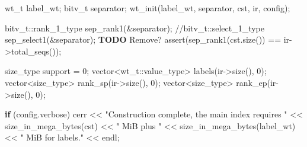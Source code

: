 \documentclass[
]{article}
\newenvironment{Shaded}{\begin{snugshade}}{\end{snugshade}}
\newcommand{\AlertTok}[1]{\textcolor[rgb]{0.58,0.85,0.30}{\textbf{\colorbox[rgb]{0.30,0.12,0.14}{#1}}}}
\newcommand{\CommentTok}[1]{\textcolor[rgb]{0.48,0.49,0.49}{#1}}
\newcommand{\ControlFlowTok}[1]{\textcolor[rgb]{0.99,0.74,0.29}{\textbf{#1}}}
\newcommand{\DecValTok}[1]{\textcolor[rgb]{0.96,0.45,0.00}{#1}}
\newcommand{\NormalTok}[1]{\textcolor[rgb]{0.81,0.81,0.76}{#1}}
\newcommand{\OperatorTok}[1]{\textcolor[rgb]{0.81,0.81,0.76}{#1}}
\newcommand{\StringTok}[1]{\textcolor[rgb]{0.96,0.31,0.31}{#1}}
\begin{document}
\begin{Shaded}
\begin{Highlighting}[]
\NormalTok{    wt\_t label\_wt}\OperatorTok{;}
\NormalTok{    bitv\_t separator}\OperatorTok{;}
\NormalTok{    wt\_init}\OperatorTok{(}\NormalTok{label\_wt}\OperatorTok{,}\NormalTok{ separator}\OperatorTok{,}\NormalTok{ cst}\OperatorTok{,}\NormalTok{ ir}\OperatorTok{,}\NormalTok{ config}\OperatorTok{);}

\NormalTok{    bitv\_t}\OperatorTok{::}\NormalTok{rank\_1\_type sep\_rank1}\OperatorTok{(\&}\NormalTok{separator}\OperatorTok{);}
    \CommentTok{//bitv\_t::select\_1\_type sep\_select1(\&separator); }\AlertTok{TODO}\CommentTok{ Remove?}
\NormalTok{    assert}\OperatorTok{(}\NormalTok{sep\_rank1}\OperatorTok{(}\NormalTok{cst}\OperatorTok{.}\NormalTok{size}\OperatorTok{())} \OperatorTok{==}\NormalTok{ ir}\OperatorTok{{-}\textgreater{}}\NormalTok{total\_seqs}\OperatorTok{());}
    
\NormalTok{    size\_type support }\OperatorTok{=} \DecValTok{0}\OperatorTok{;}
\NormalTok{    vector}\OperatorTok{\textless{}}\NormalTok{wt\_t}\OperatorTok{::}\NormalTok{value\_type}\OperatorTok{\textgreater{}}\NormalTok{ labels}\OperatorTok{(}\NormalTok{ir}\OperatorTok{{-}\textgreater{}}\NormalTok{size}\OperatorTok{(),} \DecValTok{0}\OperatorTok{);}
\NormalTok{    vector}\OperatorTok{\textless{}}\NormalTok{size\_type}\OperatorTok{\textgreater{}}\NormalTok{ rank\_sp}\OperatorTok{(}\NormalTok{ir}\OperatorTok{{-}\textgreater{}}\NormalTok{size}\OperatorTok{(),} \DecValTok{0}\OperatorTok{);}
\NormalTok{    vector}\OperatorTok{\textless{}}\NormalTok{size\_type}\OperatorTok{\textgreater{}}\NormalTok{ rank\_ep}\OperatorTok{(}\NormalTok{ir}\OperatorTok{{-}\textgreater{}}\NormalTok{size}\OperatorTok{(),} \DecValTok{0}\OperatorTok{);}

    \ControlFlowTok{if} \OperatorTok{(}\NormalTok{config}\OperatorTok{.}\NormalTok{verbose}\OperatorTok{)}
\NormalTok{        cerr }\OperatorTok{\textless{}\textless{}} \StringTok{"Construction complete, the main index requires "} \OperatorTok{\textless{}\textless{}}\NormalTok{ size\_in\_mega\_bytes}\OperatorTok{(}\NormalTok{cst}\OperatorTok{)} \OperatorTok{\textless{}\textless{}} \StringTok{" MiB plus "} \OperatorTok{\textless{}\textless{}}\NormalTok{ size\_in\_mega\_bytes}\OperatorTok{(}\NormalTok{label\_wt}\OperatorTok{)} \OperatorTok{\textless{}\textless{}} \StringTok{" MiB for labels."} \OperatorTok{\textless{}\textless{}}\NormalTok{ endl}\OperatorTok{;}
    

\end{Highlighting}
\end{Shaded}
\end{document}
